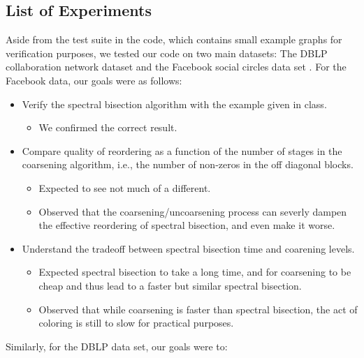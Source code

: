 \documentclass[11pt]{article}
\newcommand{\noi}{\noindent}
\begin{document}
\subsection{List of Experiments}

Aside from the test suite in the code, which contains small example graphs
for verification purposes, we tested our code on two main datasets: The DBLP
collaboration network dataset and the Facebook social circles data set
\cite{snapnets,facebook,dblp}. For the Facebook data, our goals were as follows: 

\begin{itemize}
	\item Verify the spectral bisection algorithm with the example given in
		class. 
		\begin{itemize}
			\item We confirmed the correct result.
		\end{itemize}
	\item Compare quality of reordering as a function of the number of
stages in the coarsening algorithm, i.e., the number of non-zeros in the off
diagonal blocks. 
		\begin{itemize}
			\item Expected to see not much of a different. 
			\item Observed that the coarsening/uncoarsening process can
				severly dampen the effective reordering of
				spectral bisection, and even make it worse.
		\end{itemize}
	\item Understand the tradeoff between spectral bisection time and
		coarening levels. 
		\begin{itemize}
			\item Expected spectral bisection to take a long time,
				and for coarsening to be cheap and thus lead to
				a faster but similar spectral bisection. 
			\item Observed that while coarsening is faster than
				spectral bisection, the act of coloring is still
				to slow for practical purposes.
		\end{itemize}
\end{itemize}
\noi Similarly, for the DBLP data set, our goals were to: 
\end{document}
